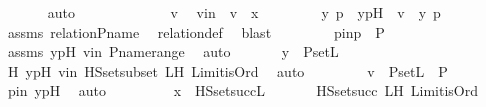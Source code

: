 \begin{isabellebody}
\ \ \ \ \ \isamarkupfalse%
\ auto\ \ \isanewline
\ \ \isamarkupfalse%
\ {\isacharminus}{\kern0pt}\ \isanewline
\ \ \ \ \isamarkupfalse%
\ v\ \isamarkupfalse%
\ vin\ {\isacharcolon}{\kern0pt}\ {\isachardoublequoteopen}v\ {\isasymin}\ x{\isachardoublequoteclose}\ \isanewline
\ \ \ \ \isamarkupfalse%
\ \isamarkupfalse%
\ y\ p\ \ ypH\ {\isacharcolon}{\kern0pt}\ {\isachardoublequoteopen}v\ {\isacharequal}{\kern0pt}\ {\isacharless}{\kern0pt}y{\isacharcomma}{\kern0pt}\ p{\isachargreater}{\kern0pt}{\isachardoublequoteclose}\ \isamarkupfalse%
\ assms\ relation{\isacharunderscore}{\kern0pt}P{\isacharunderscore}{\kern0pt}name\ \isamarkupfalse%
\ relation{\isacharunderscore}{\kern0pt}def\ \isamarkupfalse%
\ blast\ \isanewline
\ \ \ \ \isamarkupfalse%
\ \isamarkupfalse%
\ pin{\isacharcolon}{\kern0pt}{\isachardoublequoteopen}p\ {\isasymin}\ P{\isachardoublequoteclose}\ \isamarkupfalse%
\ assms\ ypH\ vin\ P{\isacharunderscore}{\kern0pt}name{\isacharunderscore}{\kern0pt}range\ \isamarkupfalse%
\ auto\ \isanewline
\ \ \ \ \isamarkupfalse%
\ {\isachardoublequoteopen}y\ {\isasymin}\ P{\isacharunderscore}{\kern0pt}set{\isacharparenleft}{\kern0pt}L{\isacharparenright}{\kern0pt}{\isachardoublequoteclose}\ \isamarkupfalse%
\ H\ ypH\ vin\ HS{\isacharunderscore}{\kern0pt}set{\isacharunderscore}{\kern0pt}subset\ LH\ Limit{\isacharunderscore}{\kern0pt}is{\isacharunderscore}{\kern0pt}Ord\ \isamarkupfalse%
\ auto\ \isanewline
\ \ \ \ \isamarkupfalse%
\ \isamarkupfalse%
\ {\isachardoublequoteopen}v\ {\isasymin}\ P{\isacharunderscore}{\kern0pt}set{\isacharparenleft}{\kern0pt}L{\isacharparenright}{\kern0pt}\ {\isasymtimes}\ P{\isachardoublequoteclose}\ \isamarkupfalse%
\ pin\ ypH\ \isamarkupfalse%
\ auto\ \isanewline
\ \ \isamarkupfalse%
\isanewline
\ \ \isamarkupfalse%
\ \isamarkupfalse%
\ {\isachardoublequoteopen}x\ {\isasymin}\ HS{\isacharunderscore}{\kern0pt}set{\isacharparenleft}{\kern0pt}succ{\isacharparenleft}{\kern0pt}L{\isacharparenright}{\kern0pt}{\isacharparenright}{\kern0pt}{\isachardoublequoteclose}\ \isanewline
\ \ \ \ \isamarkupfalse%
\ HS{\isacharunderscore}{\kern0pt}set{\isacharunderscore}{\kern0pt}succ\ LH\ Limit{\isacharunderscore}{\kern0pt}is{\isacharunderscore}{\kern0pt}Ord\ \isamarkupfalse%

\end{isabellebody}
